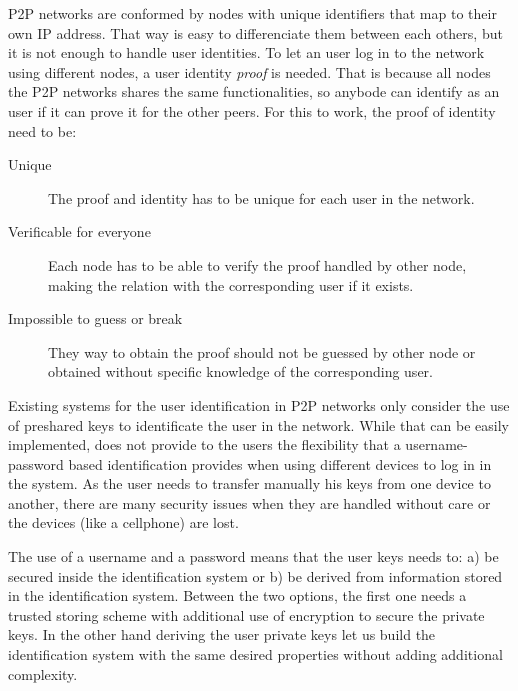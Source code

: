 P2P networks are conformed by nodes with unique identifiers that map to their
own IP address. That way is easy to differenciate them between each others, but
it is not enough to handle user identities. To let an user log in to the
network using different nodes, a user identity \textit{proof} is needed. That
is because all nodes the P2P networks shares the same functionalities, so
anybode can identify as an user if it can prove it for the other peers. For
this to work, the proof of identity need to be:
\begin{description}
  \item[Unique] The proof and identity has to be unique for each user in the network.

  \item[Verificable for everyone]  Each node has to be able to verify the proof
    handled by other node, making the relation with the corresponding user if it
    exists.
  \item[Impossible to guess or break] They way to obtain the proof should not
    be guessed by other node or obtained without specific knowledge of the
    corresponding user.
\end{description}


Existing systems for the user identification in P2P networks only consider the
use of preshared keys to identificate the user in the network. While that can
be easily implemented, does not provide to the users the flexibility that a
username-password based identification provides when using different devices to
log in in the system. As the user needs to transfer manually his keys from one
device to another, there are many security issues when they are handled without
care or the devices (like a cellphone) are lost. 

The use of a username and a password means that the user keys needs to: a) be
secured inside the identification system or b) be derived from information
stored in the identification system. Between  the two options, the first one
needs a trusted storing scheme with additional use of encryption to secure the
private keys. In the other hand deriving the user private keys let us build the
identification system with the same desired properties without adding
additional complexity.

